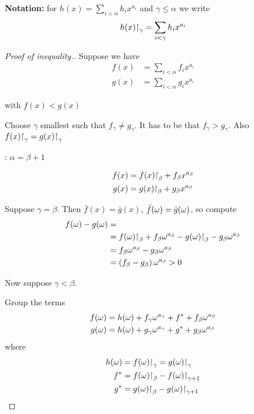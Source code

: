 \textbf{Notation:} for $h(x) = \sum_{i < \alpha} h_i x^{a_i}$ and $\gamma \leq \alpha$ we write
\begin{align*}
	h(x)\mathord{\upharpoonright}_{\gamma} = \sum_{i < \gamma} h_i x^{a_i}
\end{align*}

\begin{proof}[Proof of inequality.] %
	Suppose we have
	\begin{align*}
		f(x) &= \sum_{i < \alpha} f_i x^{a_i} \\
		g(x) &= \sum_{i < \alpha} g_i x^{a_i}
	\end{align*}

	with $f(x) < g(x)$

	Choose $\gamma$ smallest such that $f_\gamma \neq g_\gamma$.
	It has to be that $f_\gamma > g_\gamma$. Also $f(x)\mathord{\upharpoonright}_{\gamma} = g(x)\mathord{\upharpoonright}_{\gamma}$

	: $\alpha = \beta + 1$

	\begin{align*}
		f(x) &= f(x)\mathord{\upharpoonright}_{\beta} + f_\beta x^{a_\beta}\\
		g(x) &= g(x)\mathord{\upharpoonright}_{\beta} + g_\beta x^{a_\beta}
	\end{align*}

	Suppose $\gamma = \beta$.
	Then $\bar f(x) = \bar g(x)$, $\bar f(\omega) = \bar g(\omega)$, so compute
	\begin{align*}
		f(\omega) - g(\omega) &= \\
		&= f(\omega)\mathord{\upharpoonright}_{\beta} + f_\beta \omega^{a_\beta} - g(\omega)\mathord{\upharpoonright}_{\beta} - g_\beta \omega^{a_\beta} \\
		&= f_\beta \omega^{a_\beta} - g_\beta \omega^{a_\beta} \\
		&= \left( f_\beta - g_\beta \right) \omega^{a_\beta} > 0
	\end{align*}

	Now suppose $\gamma < \beta$.

	Group the terms
	\begin{align*}
		f(\omega) &= h(\omega) + f_\gamma \omega^{a_\gamma} + f^* + f_\beta \omega^{a_\beta} \\
		g(\omega) &= h(\omega) + g_\gamma \omega^{a_\gamma} + g^* + g_\beta \omega^{a_\beta}
	\end{align*}
	where
	\begin{align*}
		h(\omega) &= f(\omega)\mathord{\upharpoonright}_{\gamma} = g(\omega)\mathord{\upharpoonright}_{\gamma} \\
		f^* &= f(\omega)\mathord{\upharpoonright}_{\beta} - f(\omega)\mathord{\upharpoonright}_{\gamma + 1} \\
		g^* &= g(\omega)\mathord{\upharpoonright}_{\beta} - g(\omega)\mathord{\upharpoonright}_{\gamma + 1}
	\end{align*}


\end{proof}
